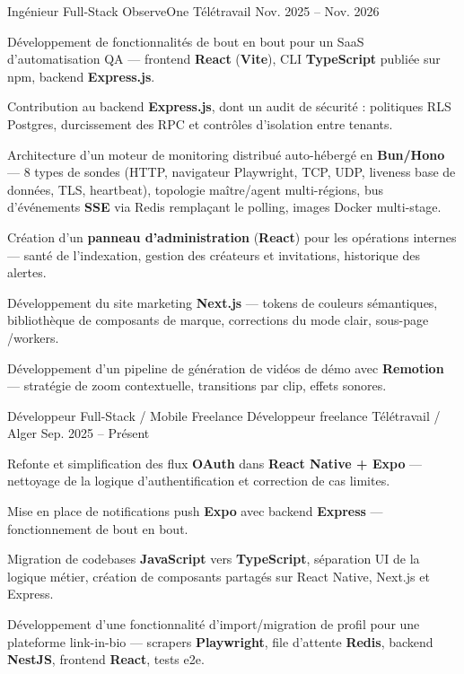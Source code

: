 \begin{cventries}

  \cventry
  {Ingénieur Full-Stack}
  {ObserveOne}
  {Télétravail}
  {Nov. 2025 -- Nov. 2026}
  {
    \begin{cvitems}
      \item {Développement de fonctionnalités de bout en bout pour un SaaS d'automatisation QA — frontend \textbf{React} (\textbf{Vite}), CLI \textbf{TypeScript} publiée sur npm, backend \textbf{Express.js}.}
      \item {Contribution au backend \textbf{Express.js}, dont un audit de sécurité : politiques RLS Postgres, durcissement des RPC et contrôles d'isolation entre tenants.}
      \item {Architecture d'un moteur de monitoring distribué auto-hébergé en \textbf{Bun/Hono} — 8 types de sondes (HTTP, navigateur Playwright, TCP, UDP, liveness base de données, TLS, heartbeat), topologie maître/agent multi-régions, bus d'événements \textbf{SSE} via Redis remplaçant le polling, images Docker multi-stage.}
      \item {Création d'un \textbf{panneau d'administration} (\textbf{React}) pour les opérations internes — santé de l'indexation, gestion des créateurs et invitations, historique des alertes.}
      \item {Développement du site marketing \textbf{Next.js} — tokens de couleurs sémantiques, bibliothèque de composants de marque, corrections du mode clair, sous-page /workers.}
      \item {Développement d'un pipeline de génération de vidéos de démo avec \textbf{Remotion} — stratégie de zoom contextuelle, transitions par clip, effets sonores.}
    \end{cvitems}
  }


  \cventry
  {Développeur Full-Stack / Mobile Freelance}
  {Développeur freelance}
  {Télétravail / Alger}
  {Sep. 2025 -- Présent}
  {
    \begin{cvitems}
      \item {Refonte et simplification des flux \textbf{OAuth} dans \textbf{React Native + Expo} — nettoyage de la logique d'authentification et correction de cas limites.}
      \item {Mise en place de notifications push \textbf{Expo} avec backend \textbf{Express} — fonctionnement de bout en bout.}
      \item {Migration de codebases \textbf{JavaScript} vers \textbf{TypeScript}, séparation UI de la logique métier, création de composants partagés sur React Native, Next.js et Express.}
      \item {Développement d'une fonctionnalité d'import/migration de profil pour une plateforme link-in-bio — scrapers \textbf{Playwright}, file d'attente \textbf{Redis}, backend \textbf{NestJS}, frontend \textbf{React}, tests e2e.}
    \end{cvitems}
  }


\end{cventries}
